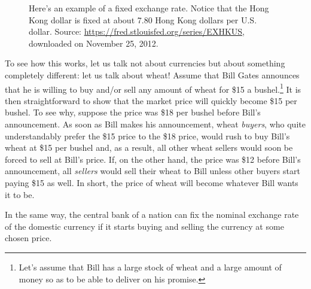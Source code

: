 \documentclass[
  letterpaper,
]{book}
\theoremstyle{plain}
\theoremstyle{remark}
\begin{document}
\begin{figure}


\caption{\label{fig-chart-hong-kong-dollar}Here's an example of a fixed
exchange rate. Notice that the Hong Kong dollar is fixed at about 7.80
Hong Kong dollars per U.S. dollar. Source:
\url{https://fred.stlouisfed.org/series/EXHKUS}, downloaded on November
25, 2012.}

\end{figure}%

To see how this works, let us talk not about currencies but about
something completely different: let us talk about wheat! Assume that
Bill Gates announces that he is willing to buy and/or sell any amount of
wheat for \$15 a bushel.\footnote{Let's assume that Bill has a large
  stock of wheat and a large amount of money so as to be able to deliver
  on his promise.} It is then straightforward to show that the market
price will quickly become \$15 per bushel. To see why, suppose the price
was \$18 per bushel before Bill's announcement. As soon as Bill makes
his announcement, wheat \emph{buyers}, who quite understandably prefer
the \$15 price to the \$18 price, would rush to buy Bill's wheat at \$15
per bushel and, as a result, all other wheat sellers would soon be
forced to sell at Bill's price. If, on the other hand, the price was
\$12 before Bill's announcement, all \emph{sellers} would sell their
wheat to Bill unless other buyers start paying \$15 as well. In short,
the price of wheat will become whatever Bill wants it to be.

In the same way, the central bank of a nation can fix the nominal
exchange rate of the domestic currency if it starts buying and selling
the currency at some chosen price.
\end{document}
